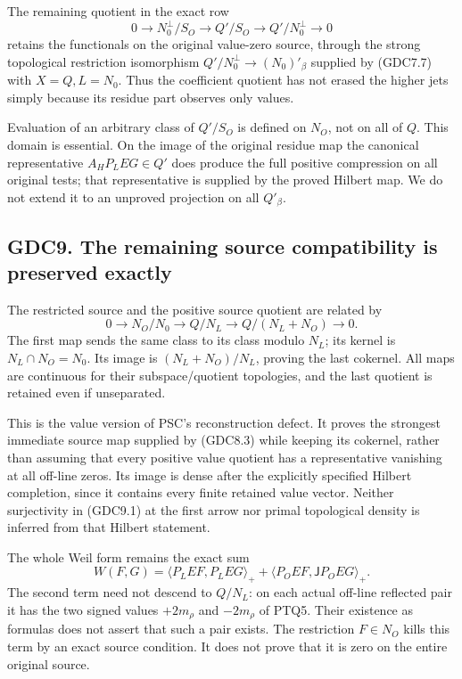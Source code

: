 The remaining quotient in the exact row \[
0\to N_0^\perp/S_O\to Q'/S_O\to Q'/N_0^\perp\to0
\tag{GDC8.5}
\] retains the functionals on the original value-zero source, through
the strong topological restriction isomorphism
\(Q'/N_0^\perp\to (N_0)'_\beta\) supplied by (GDC7.7) with
\(X=Q,L=N_0\). Thus the coefficient quotient has not erased the higher
jets simply because its residue part observes only values.

Evaluation of an arbitrary class of \(Q'/S_O\) is defined on \(N_O\),
not on all of \(Q\). This domain is essential. On the image of the
original residue map the canonical representative \(A_HP_LEG\in Q'\)
does produce the full positive compression on all original tests; that
representative is supplied by the proved Hilbert map. We do not extend
it to an unproved projection on all \(Q'_\beta\).

\subsection{GDC9. The remaining source compatibility is preserved
exactly}\label{gdc9.-the-remaining-source-compatibility-is-preserved-exactly}

The restricted source and the positive source quotient are related by \[
0\to N_O/N_0\longrightarrow Q/N_L
\longrightarrow Q/(N_L+N_O)\to0.
\tag{GDC9.1}
\] The first map sends the same class to its class modulo \(N_L\); its
kernel is \(N_L\cap N_O=N_0\). Its image is \((N_L+N_O)/N_L\), proving
the last cokernel. All maps are continuous for their subspace/quotient
topologies, and the last quotient is retained even if unseparated.

This is the value version of PSC's reconstruction defect. It proves the
strongest immediate source map supplied by (GDC8.3) while keeping its
cokernel, rather than assuming that every positive value quotient has a
representative vanishing at all off-line zeros. Its image is dense after
the explicitly specified Hilbert completion, since it contains every
finite retained value vector. Neither surjectivity in (GDC9.1) at the
first arrow nor primal topological density is inferred from that Hilbert
statement.

The whole Weil form remains the exact sum \[
W(F,G)=\langle P_LEF,P_LEG\rangle_+
+\langle P_OEF,\mathsf JP_OEG\rangle_+.
\tag{GDC9.2}
\] The second term need not descend to \(Q/N_L\): on each actual
off-line reflected pair it has the two signed values \(+2m_\rho\) and
\(-2m_\rho\) of PTQ5. Their existence as formulas does not assert that
such a pair exists. The restriction \(F\in N_O\) kills this term by an
exact source condition. It does not prove that it is zero on the entire
original source.

